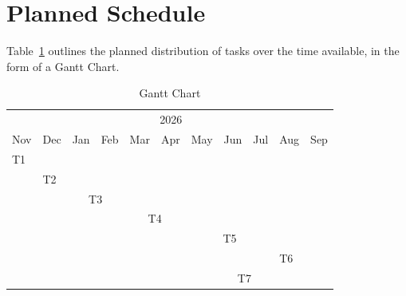 \section{Planned Schedule}
\label{sec:planned_schedule}

Table~\ref{tab:gantt_chart} outlines the planned distribution of tasks over the time available, in the form of a Gantt Chart.

\begin{table}[htbp]
\centering
\begin{tabular}{@{}p{1cm}p{1cm}p{1cm}p{1cm}p{1cm}p{1cm}p{1cm}p{1cm}p{1cm}p{1cm}p{1cm}@{}}
\toprule
\rowcolor[HTML]{C0C0C0} 
\multicolumn{2}{c|}{\cellcolor[HTML]{C0C0C0}2025} &
  \multicolumn{9}{c}{\cellcolor[HTML]{C0C0C0}2026} \\
\rowcolor[HTML]{EFEFEF} 
Nov &
  Dec &
  Jan &
  Feb &
  Mar &
  Apr &
  May &
  Jun &
  Jul &
  Aug &
  \multicolumn{1}{c}{\cellcolor[HTML]{EFEFEF}Sep} \\ \midrule
\rowcolor[HTML]{FFFFFF} 
\cellcolor[HTML]{34CDF9}T1 &
   &
   &
   &
   &
   &
   &
   &
   &
   &
   \\
\rowcolor[HTML]{FFFFFF} 
 &
  \cellcolor[HTML]{FFCC67}T2 &
   &
   &
   &
   &
   &
   &
   &
   &
   \\
\rowcolor[HTML]{FFFFFF} 
 &
   &
  \multicolumn{2}{c}{\cellcolor[HTML]{34CDF9}T3} &
   &
   &
   &
   &
   &
   &
   \\
\rowcolor[HTML]{FFFFFF} 
 &
   &
   &
   &
  \multicolumn{2}{c}{\cellcolor[HTML]{FFCC67}T4} &
   &
   &
   &
   &
   \\
\rowcolor[HTML]{FFFFFF} 
 &
   &
   &
   &
   &
   &
  \multicolumn{3}{c}{\cellcolor[HTML]{34CDF9}T5} &
   &
   \\
\rowcolor[HTML]{FFFFFF} 
 &
   &
   &
   &
   &
   &
   &
   &
   &
  \cellcolor[HTML]{FFCC67}T6 &
   \\
\rowcolor[HTML]{34CDF9} 
\cellcolor[HTML]{FFFFFF} &
  \cellcolor[HTML]{FFFFFF} &
  \cellcolor[HTML]{FFFFFF} &
  \cellcolor[HTML]{FFFFFF} &
  \cellcolor[HTML]{FFFFFF} &
  \multicolumn{6}{c}{\cellcolor[HTML]{34CDF9}T7} \\ \bottomrule
\end{tabular}
\caption{Gantt Chart}
\label{tab:gantt_chart}
\end{table}

